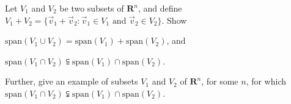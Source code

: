 \documentclass[a4paper,11pt]{article}
\newcommand{\R}{\mathbf{R}}
\begin{document}
 Let $V_1$ and $V_2$ be two subsets of $\R^n$, and
define $V_1+V_2=\{\vec v_1 + \vec v_2 : \vec v_1 \in V_1 \text{ and } \vec v_2
\in V_2 \}$. Show
\begin{enumerate*}[(a)]
\item $\text{span}(V_1 \cup V_2) = \text{span}(V_1) + \text{span}(V_2)$, and
\item $\text{span}(V_1 \cap V_2) \subseteqq \text{span}(V_1) \cap
  \text{span}(V_2)$.
\end{enumerate*}
Further, give an example of subsets $V_1$ and $V_2$ of $\R^n$, for some $n$, for
which $\text{span}(V_1 \cap V_2) \subsetneqq \text{span}(V_1) \cap
\text{span}(V_2)$.
\end{document}
